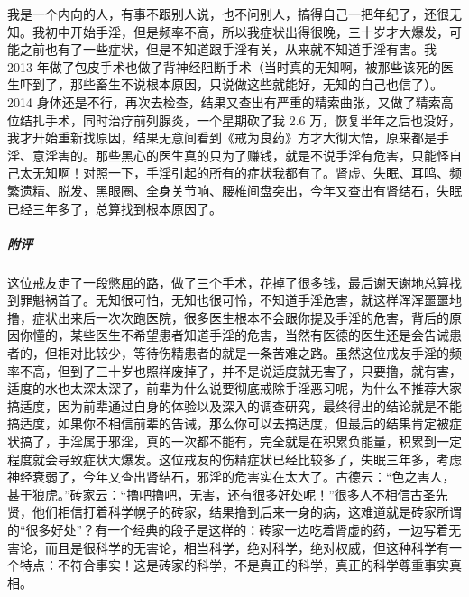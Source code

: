 \begin{case}
    我是一个内向的人，有事不跟别人说，也不问别人，搞得自己一把年纪了，还很无知。我初中开始手淫，但是频率不高，所以我症状出得很晚，三十岁才大爆发，可能之前也有了一些症状，但是不知道跟手淫有关，从来就不知道手淫有害。我 2013 年做了包皮手术也做了背神经阻断手术（当时真的无知啊，被那些该死的医生吓到了，那些畜生不说根本原因，只说做这些就能好，无知的自己也信了）。2014 身体还是不行，再次去检查，结果又查出有严重的精索曲张，又做了精索高位结扎手术，同时治疗前列腺炎，一个星期砍了我 2.6 万，恢复半年之后也没好，我才开始重新找原因，结果无意间看到《戒为良药》方才大彻大悟，原来都是手淫、意淫害的。那些黑心的医生真的只为了赚钱，就是不说手淫有危害，只能怪自己太无知啊！对照一下，手淫引起的所有的症状我都有了。肾虚、失眠、耳鸣、频繁遗精、脱发、黑眼圈、全身关节响、腰椎间盘突出，今年又查出有肾结石，失眠已经三年多了，总算找到根本原因了。
    \subparagraph{附评} 这位戒友走了一段憋屈的路，做了三个手术，花掉了很多钱，最后谢天谢地总算找到罪魁祸首了。无知很可怕，无知也很可怜，不知道手淫危害，就这样浑浑噩噩地撸，症状出来后一次次跑医院，很多医生根本不会跟你提及手淫的危害，背后的原因你懂的，某些医生不希望患者知道手淫的危害，当然有医德的医生还是会告诫患者的，但相对比较少，等待伤精患者的就是一条苦难之路。虽然这位戒友手淫的频率不高，但到了三十岁也照样废掉了，并不是说适度就无害了，只要撸，就有害，适度的水也太深太深了，前辈为什么说要彻底戒除手淫恶习呢，为什么不推荐大家搞适度，因为前辈通过自身的体验以及深入的调查研究，最终得出的结论就是不能搞适度，如果你不相信前辈的告诫，那么你可以去搞适度，但最后的结果肯定被症状搞了，手淫属于邪淫，真的一次都不能有，完全就是在积累负能量，积累到一定程度就会导致症状大爆发。这位戒友的伤精症状已经比较多了，失眠三年多，考虑神经衰弱了，今年又查出肾结石，邪淫的危害实在太大了。古德云：“色之害人，甚于狼虎。”砖家云：“撸吧撸吧，无害，还有很多好处呢！”很多人不相信古圣先贤，他们相信打着科学幌子的砖家，结果撸到后来一身的病，这难道就是砖家所谓的“很多好处”？有一个经典的段子是这样的：砖家一边吃着肾虚的药，一边写着无害论，而且是很科学的无害论，相当科学，绝对科学，绝对权威，但这种科学有一个特点：不符合事实！这是砖家的科学，不是真正的科学，真正的科学尊重事实真相。
\end{case}

